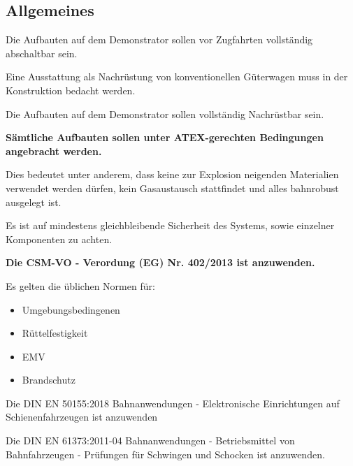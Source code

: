\subsection{Allgemeines}
\begin{feat}
Die Aufbauten auf dem Demonstrator sollen vor Zugfahrten vollständig abschaltbar sein.
\end{feat}
Eine Ausstattung als Nachrüstung von konventionellen Güterwagen muss in der Konstruktion bedacht werden.\par
\begin{feat}
Die Aufbauten auf dem Demonstrator sollen vollständig Nachrüstbar sein.
\end{feat}
\begin{feat}
\textbf{Sämtliche Aufbauten sollen unter ATEX-gerechten Bedingungen angebracht werden.}
\end{feat}
\begin{rem}
Dies bedeutet unter anderem, dass keine zur Explosion neigenden Materialien verwendet werden dürfen, kein Gasaustausch stattfindet und alles bahnrobust ausgelegt ist.
\end{rem}
Es ist auf mindestens gleichbleibende  Sicherheit des Systems, sowie einzelner Komponenten zu achten.
\begin{feat}
\textbf{Die CSM-VO - Verordung (EG) Nr. 402/2013 ist anzuwenden.}
\end{feat}
Es gelten die üblichen Normen für:
\begin{itemize}
    \item Umgebungsbedingenen
    \item Rüttelfestigkeit
    \item EMV
    \item Brandschutz
\end{itemize}
\begin{feat}
Die \acrshort{DIN} \acrshort{EN} 50155:2018 Bahnanwendungen - Elektronische Einrichtungen auf Schienenfahrzeugen ist anzuwenden
\end{feat}
\begin{feat}
Die \acrshort{DIN} \acrshort{EN} 61373:2011-04 Bahnanwendungen - Betriebsmittel von Bahnfahrzeugen - Prüfungen für Schwingen und Schocken ist anzuwenden.
\end{feat}
